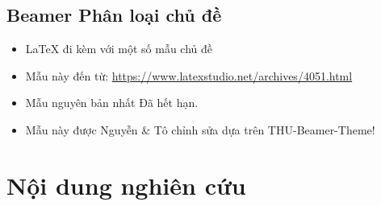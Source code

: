 \documentclass{beamer}
\begin{document}
\subsection{Beamer Phân loại chủ đề}
\begin{frame}
    \begin{itemize}
        \item \LaTeX{} đi kèm với một số mẫu chủ đề
        \item Mẫu này đến từ: \newline \url{https://www.latexstudio.net/archives/4051.html}
        \item Mẫu nguyên bản nhất \href{http://far.tooold.cn/post/latex/beamertsinghua}{\color{purple}{link}} \cite{origin} Đã hết hạn.
        \item Mẫu này được Nguyễn \& Tô chỉnh sửa dựa trên THU-Beamer-Theme!\href{https://github.com/Suluming1999/HOU-Beamer-Theme}{\color{red}{bấm}}
        
    \end{itemize}
\end{frame}


\section{Nội dung nghiên cứu} %

\end{document}
